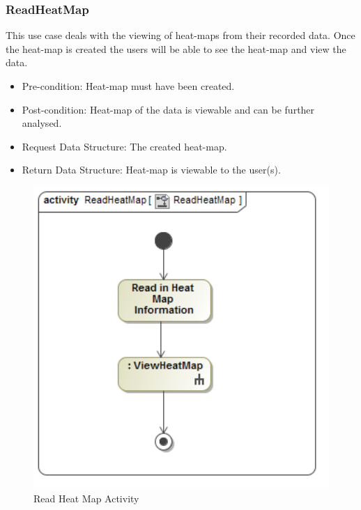 	\subsubsection{ReadHeatMap}
	This use case deals with the viewing of heat-maps from their recorded data. Once the heat-map is created the users will be able to see the heat-map and view the data.
	\begin{itemize}
		\item Pre-condition: Heat-map must have been created.
		\item Post-condition: Heat-map of the data is viewable and can be further analysed.
		\item Request Data Structure: The created heat-map.
		\item Return Data Structure: Heat-map is viewable to the user(s).
	\end{itemize}
	
	\begin{figure}[!ht]
		\centering
		\includegraphics[scale=0.5,width=15cm,keepaspectratio]{Diagrams/Activity_Diagram__ReadHeatMap__ReadHeatMap.png}
		\caption{Read Heat Map Activity}
	\end{figure}
	
